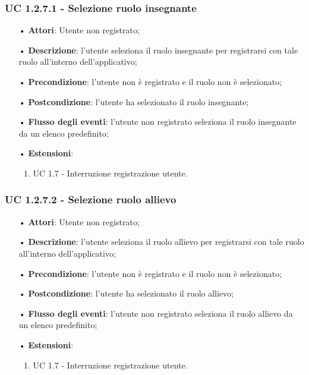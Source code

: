 \subsubsection{UC 1.2.7.1 - Selezione ruolo insegnante}
\begin{itemize}
	\item[•]\textbf{Attori}: Utente non registrato;
	\item[•]\textbf{Descrizione}: l'utente seleziona il ruolo insegnante per registrarsi con tale ruolo all'interno dell'applicativo;
	\item[•]\textbf{Precondizione}: l'utente non è registrato e il ruolo non è selezionato;
	\item[•]\textbf{Postcondizione}: l'utente ha selezionato il ruolo insegnante;
	\item[•]\textbf{Flusso degli eventi}: l'utente non registrato seleziona il ruolo insegnante da un elenco predefinito;
	\item[•]\textbf{Estensioni}:
	\begin{enumerate}
		\item UC 1.7 - Interruzione registrazione utente.
	\end{enumerate}
\end{itemize}
\subsubsection{UC 1.2.7.2 - Selezione ruolo allievo}
\begin{itemize}
	\item[•]\textbf{Attori}: Utente non registrato;
	\item[•]\textbf{Descrizione}: l'utente seleziona il ruolo allievo per registrarsi con tale ruolo all'interno dell'applicativo;
	\item[•]\textbf{Precondizione}: l'utente non è registrato e il ruolo non è selezionato;
	\item[•]\textbf{Postcondizione}: l'utente ha selezionato il ruolo allievo;
	\item[•]\textbf{Flusso degli eventi}: l'utente non registrato seleziona il ruolo allievo da un elenco predefinito;
	\item[•]\textbf{Estensioni}:
	\begin{enumerate}
		\item UC 1.7 - Interruzione registrazione utente.
	\end{enumerate}
\end{itemize}
